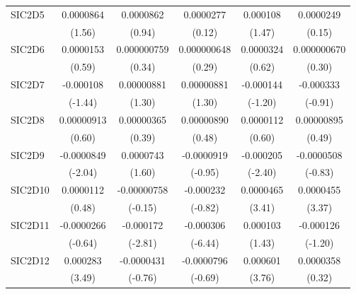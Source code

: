 \begin{table}[htbp]
\begin{tabular}{l*{5}{c}}
SIC2D5      &   0.0000864         &   0.0000862         &   0.0000277         &    0.000108         &   0.0000249         \\
            &      (1.56)         &      (0.94)         &      (0.12)         &      (1.47)         &      (0.15)         \\
SIC2D6      &   0.0000153         & 0.000000759         & 0.000000648         &   0.0000324         & 0.000000670         \\
            &      (0.59)         &      (0.34)         &      (0.29)         &      (0.62)         &      (0.30)         \\
SIC2D7      &   -0.000108         &  0.00000881         &  0.00000881         &   -0.000144         &   -0.000333         \\
            &     (-1.44)         &      (1.30)         &      (1.30)         &     (-1.20)         &     (-0.91)         \\
SIC2D8      &  0.00000913         &  0.00000365         &  0.00000890         &   0.0000112         &  0.00000895         \\
            &      (0.60)         &      (0.39)         &      (0.48)         &      (0.60)         &      (0.49)         \\
SIC2D9      &  -0.0000849\sym{*}  &   0.0000743         &  -0.0000919         &   -0.000205\sym{*}  &  -0.0000508         \\
            &     (-2.04)         &      (1.60)         &     (-0.95)         &     (-2.40)         &     (-0.83)         \\
SIC2D10     &   0.0000112         & -0.00000758         &   -0.000232         &   0.0000465\sym{***}&   0.0000455\sym{***}\\
            &      (0.48)         &     (-0.15)         &     (-0.82)         &      (3.41)         &      (3.37)         \\
SIC2D11     &  -0.0000266         &   -0.000172\sym{**} &   -0.000306\sym{***}&    0.000103         &   -0.000126         \\
            &     (-0.64)         &     (-2.81)         &     (-6.44)         &      (1.43)         &     (-1.20)         \\
SIC2D12     &    0.000283\sym{***}&  -0.0000431         &  -0.0000796         &    0.000601\sym{***}&   0.0000358         \\
            &      (3.49)         &     (-0.76)         &     (-0.69)         &      (3.76)         &      (0.32)         \\

\end{tabular}
\end{table}
